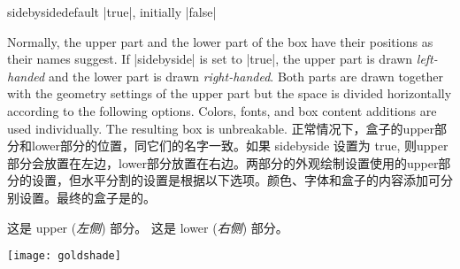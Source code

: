 \begin{docTcbKey}{sidebyside}{}{default |true|, initially |false|}
\begin{stripedbox}
Normally, the upper part and the lower part of the box have their positions
as their names suggest. If |sidebyside| is set to |true|, the upper part
is drawn \emph{left-handed} and the lower part is drawn \emph{right-handed}.
Both parts are drawn together with the geometry settings of the upper part but the
space is divided horizontally according to the following options.
Colors, fonts, and box content additions are used individually.
The resulting box is unbreakable.
\tcblower
正常情况下，盒子的upper部分和lower部分的位置，同它们的名字一致。如果 sidebyside 设置为 true, 则upper部分会放置在左边，lower部分放置在右边。两部分的外观绘制设置使用的upper部分的设置，但水平分割的设置是根据以下选项。颜色、字体和盒子的内容添加可分别设置。最终的盒子是的。
\end{stripedbox}


\begin{dispExample}

\begin{tcolorbox}[title=我的标题,sidebyside]
这是 upper (\textit{左侧}) 部分。
\tcblower
这是 lower (\textit{右侧}) 部分。
\end{tcolorbox}
\end{dispExample}


\begin{dispExample}
\begin{tcolorbox}[bicolor
,sidebyside%
,righthand width=3cm%
,sharp corners,boxrule=.4pt,colback=green!5,colbacklower=green!50!black!50]
\lipsum[2]
\tcblower
\texttt{[image: goldshade]}%
\end{tcolorbox}
\end{dispExample}
\end{docTcbKey}
 


